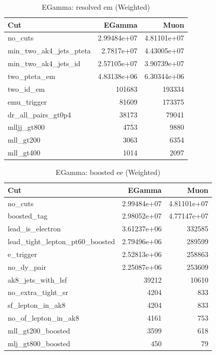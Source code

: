 \documentclass{article}
\begin{document}
\begin{table}[htbp]
\centering
\caption{EGamma: resolved em (Weighted)}
\begin{tabular}{lrr}
\hline
Cut & EGamma & Muon \\
\hline
no\_cuts & 2.99484e+07 & 4.81101e+07 \\
min\_two\_ak4\_jets\_pteta & 2.7817e+07 & 4.43005e+07 \\
min\_two\_ak4\_jets\_id & 2.57105e+07 & 3.90739e+07 \\
two\_pteta\_em & 4.83138e+06 & 6.30344e+06 \\
two\_id\_em & 101683 & 193334 \\
emu\_trigger & 81609 & 173375 \\
dr\_all\_pairs\_gt0p4 & 38173 & 79041 \\
mlljj\_gt800 & 4753 & 9880 \\
mll\_gt200 & 3063 & 6354 \\
mll\_gt400 & 1014 & 2097 \\
\hline
\end{tabular}
\end{table}

\begin{table}[htbp]
\centering
\caption{EGamma: boosted ee (Weighted)}
\begin{tabular}{lrr}
\hline
Cut & EGamma & Muon \\
\hline
no\_cuts & 2.99484e+07 & 4.81101e+07 \\
boosted\_tag & 2.98052e+07 & 4.77147e+07 \\
lead\_is\_electron & 3.61237e+06 & 332585 \\
lead\_tight\_lepton\_pt60\_boosted & 2.79496e+06 & 289599 \\
e\_trigger & 2.52813e+06 & 258863 \\
no\_dy\_pair & 2.25087e+06 & 253609 \\
ak8\_jets\_with\_lsf & 39212 & 10610 \\
no\_extra\_tight\_sr & 4204 & 833 \\
sf\_lepton\_in\_ak8 & 4204 & 833 \\
no\_of\_lepton\_in\_ak8 & 4161 & 753 \\
mll\_gt200\_boosted & 3599 & 618 \\
mlj\_gt800\_boosted & 450 & 79 \\
\hline
\end{tabular}
\end{table}
\end{document}
